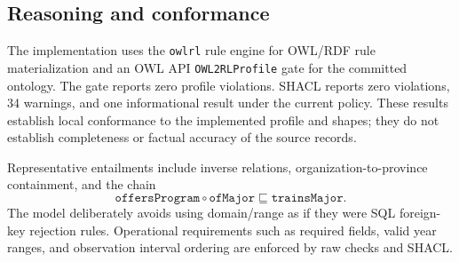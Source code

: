 \subsection{Reasoning and conformance}
The implementation uses the \texttt{owlrl} rule engine for OWL/RDF rule materialization and
an OWL API \texttt{OWL2RLProfile} gate for the committed ontology. The gate reports zero profile
violations. SHACL reports zero violations, 34 warnings, and one informational result under the
current policy. These results establish local conformance to the implemented profile and shapes;
they do not establish completeness or factual accuracy of the source records.

Representative entailments include inverse relations, organization-to-province containment,
and the chain
\[
\texttt{offersProgram} \circ \texttt{ofMajor} \sqsubseteq \texttt{trainsMajor}.
\]
The model deliberately avoids using domain/range as if they were SQL foreign-key rejection
rules. Operational requirements such as required fields, valid year ranges, and observation
interval ordering are enforced by raw checks and SHACL.
